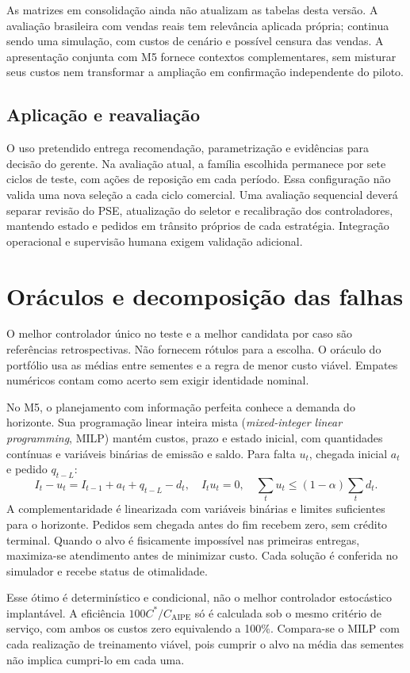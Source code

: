 As matrizes em consolidação ainda não atualizam as tabelas desta versão. A avaliação brasileira com vendas reais tem relevância aplicada própria; continua sendo uma simulação, com custos de cenário e possível censura das vendas. A apresentação conjunta com M5 fornece contextos complementares, sem misturar seus custos nem transformar a ampliação em confirmação independente do piloto.

\subsection{Aplicação e reavaliação}
\label{sec:aplicacao_aipe}
O uso pretendido entrega recomendação, parametrização e evidências para decisão do gerente. Na avaliação atual, a família escolhida permanece por sete ciclos de teste, com ações de reposição em cada período. Essa configuração não valida uma nova seleção a cada ciclo comercial. Uma avaliação sequencial deverá separar revisão do PSE, atualização do seletor e recalibração dos controladores, mantendo estado e pedidos em trânsito próprios de cada estratégia. Integração operacional e supervisão humana exigem validação adicional.

\section{Oráculos e decomposição das falhas}
O melhor controlador único no teste e a melhor candidata por caso são referências retrospectivas. Não fornecem rótulos para a escolha. O oráculo do portfólio usa as médias entre sementes e a regra de menor custo viável. Empates numéricos contam como acerto sem exigir identidade nominal.

No M5, o planejamento com informação perfeita conhece a demanda do horizonte. Sua programação linear inteira mista (\textit{mixed-integer linear programming}, MILP) mantém custos, prazo e estado inicial, com quantidades contínuas e variáveis binárias de emissão e saldo. Para falta $u_t$, chegada inicial $a_t$ e pedido $q_{t-L}$:
\[
 I_t-u_t=I_{t-1}+a_t+q_{t-L}-d_t,\quad
 I_tu_t=0,\quad \sum_tu_t\leq(1-\alpha)\sum_td_t.
\]
A complementaridade é linearizada com variáveis binárias e limites suficientes para o horizonte. Pedidos sem chegada antes do fim recebem zero, sem crédito terminal. Quando o alvo é fisicamente impossível nas primeiras entregas, maximiza-se atendimento antes de minimizar custo. Cada solução é conferida no simulador e recebe status de otimalidade.

Esse ótimo é determinístico e condicional, não o melhor controlador estocástico implantável. A eficiência $100C^*/C_{\mathrm{AIPE}}$ só é calculada sob o mesmo critério de serviço, com ambos os custos zero equivalendo a 100\%. Compara-se o MILP com cada realização de treinamento viável, pois cumprir o alvo na média das sementes não implica cumpri-lo em cada uma.


